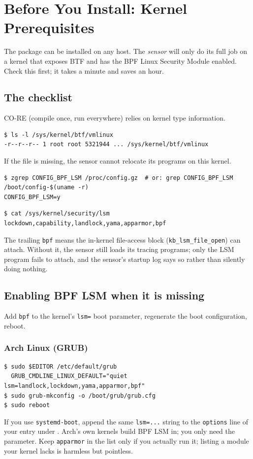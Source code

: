 \chapter{Before You Install: Kernel Prerequisites}\label{ch:prereq}
The package can be installed on any \distroname{} host. The \emph{sensor} will only do its full job on a
kernel that exposes BTF and has the BPF Linux Security Module enabled. Check this first; it takes a minute
and saves an hour.

\section{The checklist}
\resetsteps
{}
CO-RE (compile once, run everywhere) relies on kernel type information.
\begin{lstlisting}[style=console]
$ ls -l /sys/kernel/btf/vmlinux
-r--r--r-- 1 root root 5321944 ... /sys/kernel/btf/vmlinux
\end{lstlisting}
If the file is missing, the sensor cannot relocate its programs on this kernel.

\begin{lstlisting}[style=console]
$ zgrep CONFIG_BPF_LSM /proc/config.gz  # or: grep CONFIG_BPF_LSM /boot/config-$(uname -r)
CONFIG_BPF_LSM=y
\end{lstlisting}

\begin{lstlisting}[style=console]
$ cat /sys/kernel/security/lsm
lockdown,capability,landlock,yama,apparmor,bpf
\end{lstlisting}
The trailing \texttt{bpf} means the in-kernel file-access block (\texttt{kb\_lsm\_file\_open}) can attach.
Without it, the sensor still loads its tracing programs; only the LSM program fails to attach, and the
sensor's startup log says so rather than silently doing nothing.

\section{Enabling BPF LSM when it is missing}
Add \texttt{bpf} to the kernel's \texttt{lsm=} boot parameter, regenerate the boot configuration, reboot.

\ifarch
\subsection*{Arch Linux (GRUB)}
\begin{lstlisting}[style=console]
$ sudo $EDITOR /etc/default/grub
  GRUB_CMDLINE_LINUX_DEFAULT="quiet lsm=landlock,lockdown,yama,apparmor,bpf"
$ sudo grub-mkconfig -o /boot/grub/grub.cfg
$ sudo reboot
\end{lstlisting}
\begin{kbnote}
If you use \texttt{systemd-boot}, append the same \texttt{lsm=...} string to the \texttt{options} line of
your entry under . Arch's own kernels build BPF LSM in; you only need the
parameter. Keep \texttt{apparmor} in the list only if you actually run it; listing a module your kernel
lacks is harmless but pointless.
\end{kbnote}
\else
